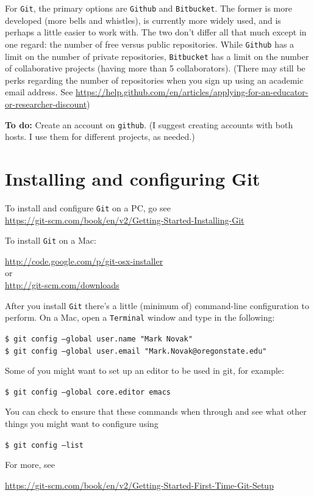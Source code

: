 \documentclass[12pt,letterpaper]{article}
\begin{document}
For \texttt{Git}, the primary options are \texttt{Github} and \texttt{Bitbucket}.  The former is more developed (more bells and whistles), is currently more widely used, and is perhaps a little easier to work with.  The two don't differ all that much except in one regard:  the number of free versus public repositories.  While \texttt{Github} has a limit on the number of private repositories, \texttt{Bitbucket} has a limit on the number of collaborative projects (having more than 5 collaborators).  (There may still be perks regarding the number of repositories when you sign up using an academic email address.  See \url{https://help.github.com/en/articles/applying-for-an-educator-or-researcher-discount})

\textbf{To do:} Create an account on \texttt{github}.  (I suggest creating accounts with both hosts.  I use them for different projects, as needed.)


\section{Installing and configuring Git}
To install and configure \texttt{Git} on a PC, go see \\
\url{https://git-scm.com/book/en/v2/Getting-Started-Installing-Git}

To install \texttt{Git} on a Mac:

\url{http://code.google.com/p/git-osx-installer}\\
or\\
\url{http://git-scm.com/downloads}


After you install \texttt{Git} there's a little (minimum of) command-line configuration to perform.  On a Mac, open a \texttt{Terminal} window and type in the following:

     \texttt{\$ git config --global user.name "Mark Novak"}\\
     \texttt{\$ git config --global user.email "Mark.Novak@oregonstate.edu"}

Some of you might want to set up an editor to be used in git, for example:

	\texttt{\$ git config --global core.editor emacs}

You can check to ensure that these commands when through and see what other things you might want to configure using

	\texttt{\$ git config --list}

For more, see\\
\begin{footnotesize}
\url{https://git-scm.com/book/en/v2/Getting-Started-First-Time-Git-Setup}
\end{footnotesize}
\end{document}
